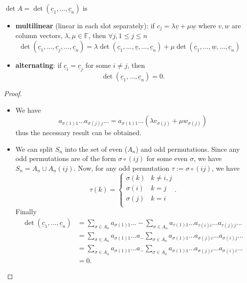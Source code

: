 \begin{prop}
    $\det A = \det (\underline{c}_1,..., \underline{c}_n)$ is
    \begin{itemize}
      \item {\bf multilinear} (linear in each slot separately): if $c_j = \lambda \underline{v} + \mu \underline{w}$ where $v, w$ are column vectors, $\lambda, \mu \in \mathbb{F}$, then $\forall j, 1 \leq j \leq n$
        \[\det (\underline{c}_1, ..., \underline{c}_j, ..., \underline{c}_n) = \lambda \det(\underline{c}_1, ..., \underline{v},..., \underline{c}_n ) + \mu \det(\underline{c}_1, ..., \underline{w}, ..., \underline{c}_n) \quad \]
    \item {\bf alternating}: if $\underline{c}_i = \underline{c}_j$ for some $i \not = j$, then
        \[\det(\underline{c}_1,..., \underline{c}_n) = 0.\]
    \end{itemize}
\end{prop}
\begin{proof} $ $
  \begin{itemize}
    \item We have
      \[ a_{\sigma(1)1}... a_{\sigma(j)j}... = a_{\sigma(1)1}... (\lambda v_{\sigma(j)} + \mu w_{\sigma(j)})\]
      thus the necessary result can be obtained.
    \item We can split $S_n$ into the set of even ($A_n$) and odd permutations. Since any odd permutations are of the form $\sigma \circ (ij)$ for some even $\sigma$, we have $S_n = A_n \cup A_n(ij)$.
      Now, for any odd permutation $\tau := \sigma \circ (ij)$, we have
      \[\tau(k) = \left\{\begin{array}{lr}
      \sigma(k) & k \not = i, j\\
      \sigma(i) & k = j\\
      \sigma(j) & k = i\\
      \end{array} \right..\]
      Finally
      \begin{align*}
        \det(\underline{c}_1,...,\underline{c}_n) &= \sum_{\sigma \in A_n} a_{\sigma(1) 1} ... - \sum_{\sigma \in A_n} a_{\tau(1) 1} ... a_{\tau(i) i} ... a_{\tau(j) j} ... \\
       &= \sum_{\sigma \in A_n} a_{\sigma(1) 1} ... a_- \sum_{\sigma \in A_n} a_{\sigma(1) 1} ... a_{\sigma (j) i} ... a_{\sigma (i) j} ...\\
         &=  \sum_{\sigma \in A_n} a_{\sigma(1) 1} ... a_- \sum_{\sigma \in A_n} a_{\sigma(1) 1} ... a_{\sigma (j) i} ... a_{\sigma (i) i} ...\\
         &= 0
      .\end{align*}
  \end{itemize}  
\end{proof}

